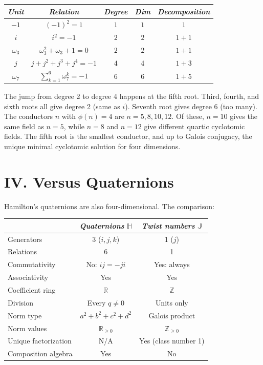 \documentclass[11pt, a4paper]{article}
\newcommand{\TT}{\mathbb{J}}
\begin{document}
\renewcommand{\arraystretch}{1.4}
\begin{tabularx}{\textwidth}{CCCCC}
\toprule
\textit{Unit} & \textit{Relation} & \textit{Degree} & \textit{Dim} & \textit{Decomposition} \\
\midrule
$-1$ & $(-1)^2 = 1$ & $1$ & $1$ & $1$ \\[0.3em]
$i$ & $i^2 = -1$ & $2$ & $2$ & $1+1$ \\[0.3em]
$\omega_3$ & $\omega_3^2 + \omega_3 + 1 = 0$ & $2$ & $2$ & $1+1$ \\[0.3em]
$j$ & $j + j^2 + j^3 + j^4 = -1$ & $4$ & $4$ & $1+3$ \\[0.3em]
$\omega_7$ & $\sum_{k=1}^{6} \omega_7^k = -1$ & $6$ & $6$ & $1+5$ \\
\bottomrule
\end{tabularx}

\vspace{0.5em}

The jump from degree 2 to degree 4 happens at the fifth root. Third, fourth, and sixth roots all give degree 2 (same as $i$). Seventh root gives degree 6 (too many). The conductors $n$ with $\phi(n) = 4$ are $n = 5, 8, 10, 12$. Of these, $n = 10$ gives the same field as $n = 5$, while $n = 8$ and $n = 12$ give different quartic cyclotomic fields. The fifth root is the smallest conductor, and up to Galois conjugacy, the unique minimal cyclotomic solution for four dimensions.

\section*{IV. Versus Quaternions}

Hamilton's quaternions are also four-dimensional. The comparison:

\renewcommand{\arraystretch}{1.4}
\begin{tabularx}{\textwidth}{LCC}
\toprule
& \textit{Quaternions} $\mathbb{H}$ & \textit{Twist numbers} $\TT$ \\
\midrule
Generators & 3 \;($i, j, k$) & 1 \;($j$) \\[0.2em]
Relations & 6 & 1 \\[0.2em]
Commutativity & No: $ij = -ji$ & Yes: always \\[0.2em]
Associativity & Yes & Yes \\[0.2em]
Coefficient ring & $\mathbb{R}$ & $\mathbb{Z}$ \\[0.2em]
Division & Every $q \neq 0$ & Units only \\[0.2em]
Norm type & $a^2+b^2+c^2+d^2$ & Galois product \\[0.2em]
Norm values & $\mathbb{R}_{\geq 0}$ & $\mathbb{Z}_{\geq 0}$ \\[0.2em]
Unique factorization & N/A & Yes (class number 1) \\[0.2em]
Composition algebra & Yes & No \\
\bottomrule
\end{tabularx}
\end{document}
